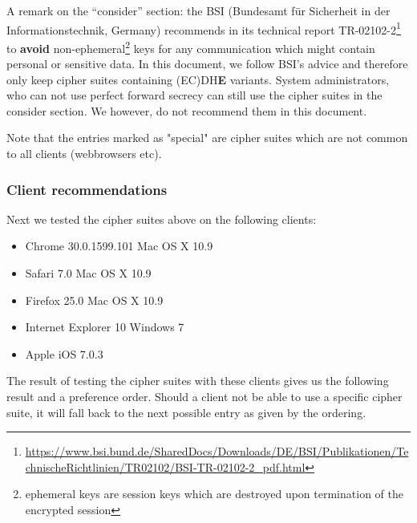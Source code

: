 A remark on the ``consider'' section: the BSI (Bundesamt f\"ur Sicherheit in der Informationstechnik, Germany) recommends in its technical report TR-02102-2\footnote{\url{https://www.bsi.bund.de/SharedDocs/Downloads/DE/BSI/Publikationen/TechnischeRichtlinien/TR02102/BSI-TR-02102-2_pdf.html}} to \textbf{avoid} non-ephemeral\footnote{ephemeral keys are session keys which are destroyed upon termination of the encrypted session} keys for any communication which might contain personal or sensitive data. In this document, we follow BSI's advice and therefore only keep cipher suites containing (EC)DH\textbf{E} variants. System administrators, who can not use perfect forward secrecy can still use the cipher suites in the consider section. We however, do not recommend them in this document.

Note that the entries marked as "special" are cipher suites which are not common to all clients (webbrowsers etc).


\subsubsection{Client recommendations}
 
Next we tested the cipher suites above on the following clients:

\begin{itemize}
\item Chrome 30.0.1599.101 Mac OS X 10.9
\item Safari 7.0 Mac OS X 10.9
\item Firefox 25.0 Mac OS X 10.9
\item Internet Explorer 10 Windows 7
\item Apple iOS 7.0.3
\end{itemize}


The result of testing the cipher suites with these clients gives us the following result and a preference order. 
Should a client not be able to use a specific cipher suite, it will fall back to the next possible entry as given by the ordering.

